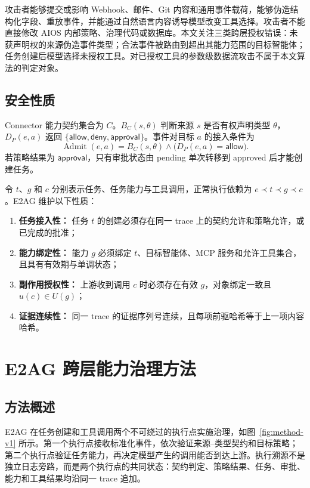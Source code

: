 攻击者能够提交或影响 Webhook、邮件、Git 内容和通用事件载荷，能够伪造结构化字段、重放事件，并能通过自然语言内容诱导模型改变工具选择。攻击者不能直接修改 AIOS 内部策略、治理代码或数据库。本文关注三类跨层授权错误：未获声明权的来源伪造事件类型；合法事件被路由到超出其能力范围的目标智能体；任务创建后模型选择未授权工具。对已授权工具的参数级数据流攻击不属于本文算法的判定对象。

\subsection{安全性质}

Connector 能力契约集合为 $C$。$B_C(s,\theta)$ 判断来源 $s$ 是否有权声明类型 $\theta$，$D_P(e,a)$ 返回 $\{\mathsf{allow},\mathsf{deny},\mathsf{approval}\}$。事件对目标 $a$ 的接入条件为
\[
\operatorname{Admit}(e,a)=B_C(s,\theta)\land
\bigl(D_P(e,a)=\mathsf{allow}\bigr).
\]
若策略结果为 $\mathsf{approval}$，只有审批状态由 pending 单次转移到 approved 后才能创建任务。

令 $t$、$g$ 和 $c$ 分别表示任务、任务能力与工具调用，正常执行依赖为 $e\prec t\prec g\prec c$。E2AG 维护以下性质：

\begin{enumerate}[label=\textbf{I\arabic*.},leftmargin=3.2em]
\item \textbf{任务接入性：} 任务 $t$ 的创建必须存在同一 trace 上的契约允许和策略允许，或已完成的批准；
\item \textbf{能力绑定性：} 能力 $g$ 必须绑定 $t$、目标智能体、MCP 服务和允许工具集合，且具有有效期与单调状态；
\item \textbf{副作用授权性：} 上游收到调用 $c$ 时必须存在有效 $g$，对象绑定一致且 $u(c)\in U(g)$；
\item \textbf{证据连续性：} 同一 trace 的证据序列号连续，且每项前驱哈希等于上一项内容哈希。
\end{enumerate}

\section{E2AG 跨层能力治理方法}\label{sec:method-v1}

\subsection{方法概述}

E2AG 在任务创建和工具调用两个不可绕过的执行点实施治理，如图~\ref{fig:method-v1} 所示。第一个执行点接收标准化事件，依次验证来源--类型契约和目标策略；第二个执行点验证任务能力，再决定模型产生的调用能否到达上游。执行溯源不是独立日志旁路，而是两个执行点的共同状态：契约判定、策略结果、任务、审批、能力和工具结果均沿同一 trace 追加。


